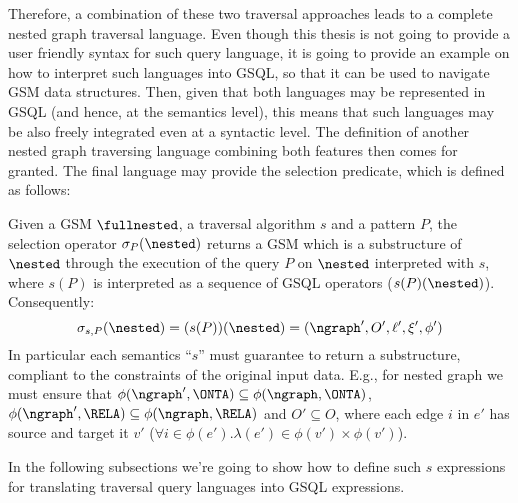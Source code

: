 Therefore, a combination of these two traversal approaches leads to a complete nested graph traversal language. Even though this thesis is not going to provide a user friendly syntax for such query language, it is going to provide an example on how to interpret such languages into GSQL, so that it can be used to navigate GSM data structures. Then, given that both languages may be represented in GSQL (and hence, at the semantics level), this means that such languages may be also freely integrated even at a syntactic level. The definition of another nested graph traversing language combining both features then comes for granted. The final language may provide the selection predicate, which is defined as follows:



\begin{definition}[Selection]
	Given a GSM $\fullnested$, a traversal algorithm $s$ and a pattern  $P$, the selection operator $\sigma_P(\nested)$ returns a GSM which is a substructure of $\nested$ through the execution of the query $P$ on $\nested$ interpreted with $s$, where $s(P)$ is interpreted as a sequence of GSQL operators ($s(P)(\nested)$). Consequently:
	\[\sigma_{s,P}(\nested)=(s(P))(\nested)=(\ngraph',O',\ell',\xi',\phi')\]
	In particular each semantics ``$s$'' must guarantee to return a substructure, compliant to the constraints of the original input data. E.g., for nested graph we must ensure that
	$\phi(\ngraph',\ONTA)\subseteq \phi(\ngraph,\ONTA)$, $\phi(\ngraph',\RELA)\subseteq \phi(\ngraph,\RELA)$ and $O'\subseteq O$, where each edge $i$ in $e'$ has source and target it $v'$ ($\forall i\in\phi(e'). \lambda(e')\in\phi(v')\times \phi(v')$).
\end{definition}

In the following subsections we're going to show how to define such $s$ expressions for translating traversal query languages into GSQL expressions.


